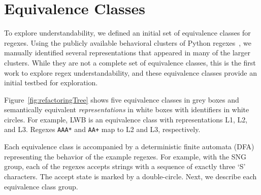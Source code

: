 \section{Equivalence Classes}
\label{sec:refactoring}
To explore understandability, we defined an initial set of equivalence classes for regexes.
Using the publicly available behavioral clusters of Python regexes~\cite{chapman2016}, we manually identified several representations that appeared in many of the larger clusters.
While they are not a complete set of equivalence classes, this is the first work to explore regex understandability, and these equivalence classes provide an initial testbed for exploration.

Figure~\ref{fig:refactoringTree} shows five equivalence classes in grey boxes and semantically equivalent \emph{representations} in white boxes with identifiers in white circles. For example, LWB is an equivalence class with representations L1, L2, and L3. Regexes \verb!AAA*! and \verb!AA+! map to L2 and L3, respectively.

Each equivalence class is accompanied by a deterministic finite automata (DFA) representing the behavior of the example regexes. For example, with the SNG group, each of the regexes accepts strings with a sequence of exactly three `S' characters. The accept state is marked by a double-circle.
Next, we describe each equivalence class group.

